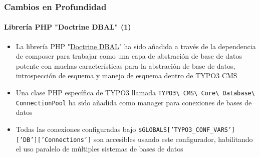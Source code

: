 \begin{frame}[fragile]
	\frametitle{Cambios en Profundidad}
	\framesubtitle{Librería PHP "Doctrine DBAL" (1)}

	\begin{itemize}

		\item La librería PHP
			"\href{http://www.doctrine-project.org}{Doctrine DBAL}"
			ha sido añadida a través de la dependencia de composer
			para trabajar como una capa de abstración de base de datos potente con muchas características para
			la abstración de base de datos, introspección de esquema y manejo de esquema dentro de
			TYPO3 CMS

		\item Una clase PHP específica de TYPO3 llamada
			\texttt{TYPO3\textbackslash
				CMS\textbackslash
				Core\textbackslash
				Database\textbackslash
				ConnectionPool}\newline
			ha sido añadida como manager para conexiones de bases de datos

		\item Todas las conexiones configuradas bajo
			\texttt{\$GLOBALS['TYPO3\_CONF\_VARS']['DB']['Connections']}\newline
			son accesibles usando este configurador, habilitando el uso paralelo de
			múltiples sistemas de bases de datos

	\end{itemize}

\end{frame}

